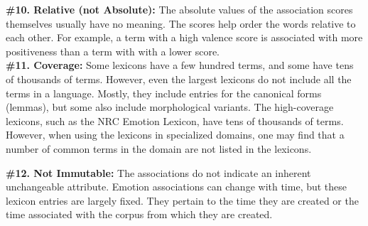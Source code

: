 \documentclass[11pt]{article}
\begin{document}
\noindent \textbf{\#10. Relative (not Absolute):} The absolute values of the association scores themselves usually have no meaning. The scores help order the words relative to each other. For example, a term with a high valence score is associated with more positiveness than a term with with a lower score. \\[-10pt] 

\noindent \textbf{\#11. Coverage:} Some lexicons have a few hundred terms, and some have tens of thousands of terms. However, even the largest lexicons do not include all the terms in a language. 
Mostly, they include entries for the canonical forms (lemmas), but some also include morphological variants. 
The high-coverage lexicons, such as the NRC Emotion Lexicon, %
have tens of thousands of terms. %
However, when using the lexicons in specialized domains, one may find that a number of common terms in the domain are not listed in the lexicons. %

\noindent \textbf{\#12. Not Immutable:}
The associations do not indicate an inherent unchangeable attribute. 
Emotion associations can change with time, but these lexicon entries are largely fixed. They pertain to the time they are created or the time associated with the corpus from which they are created. \\[-10pt]
\end{document}
